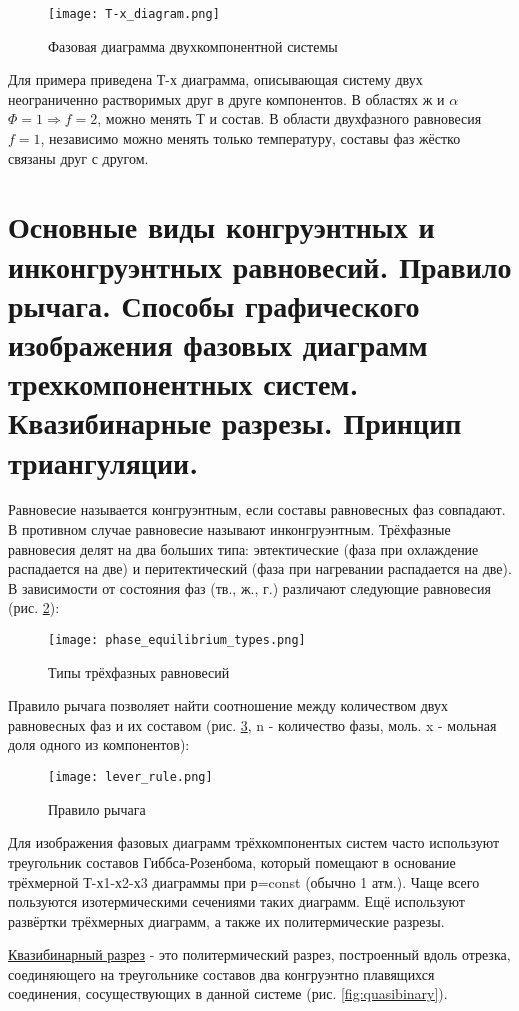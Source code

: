 \begin{figure}[h!]
\centering
\texttt{[image: T-x\_diagram.png]}\caption{Фазовая диаграмма двухкомпонентной системы}\label{fig:T-x_diagram}
\end{figure}
Для примера приведена Т-х диаграмма, описывающая систему двух неограниченно растворимых друг в друге компонентов. В областях ж и $\alpha$ $\Phi=1 \Rightarrow f=2$, можно менять Т и состав. В области двухфазного равновесия $f=1$, независимо можно менять только температуру, составы фаз жёстко связаны друг с другом.
\section{Основные виды конгруэнтных и инконгруэнтных равновесий. Правило
рычага. Способы графического изображения фазовых диаграмм
трехкомпонентных систем. Квазибинарные разрезы. Принцип триангуляции.} 
Равновесие называется конгруэнтным, если составы равновесных фаз совпадают. В противном случае равновесие называют инконгруэнтным. Трёхфазные равновесия делят на два больших типа: эвтектические (фаза при охлаждение распадается на две) и перитектический (фаза при нагревании распадается на две). В зависимости от состояния фаз (тв., ж., г.) различают следующие равновесия (рис. \ref{fig:phase_equilibrium_types}):
\begin{figure}[h!]
\centering
\texttt{[image: phase\_equilibrium\_types.png]}\caption{Типы трёхфазных равновесий}\label{fig:phase_equilibrium_types}
\end{figure}
\par Правило рычага позволяет найти соотношение между количеством двух равновесных фаз и их составом (рис. \ref{fig:lever_rule}, n - количество фазы, моль. x - мольная доля одного из компонентов):
\begin{figure}[h!]
\centering
\texttt{[image: lever\_rule.png]}\caption{Правило рычага}\label{fig:lever_rule}
\end{figure}
\par Для изображения фазовых диаграмм трёхкомпонентых систем часто используют треугольник составов Гиббса-Розенбома, который помещают в основание трёхмерной Т-х1-х2-х3 диаграммы при р=const (обычно 1 атм.). Чаще всего пользуются изотермическими сечениями таких диаграмм. Ещё используют развёртки трёхмерных диаграмм, а также их политермические разрезы. 
\par \underline{Квазибинарный разрез} - это политермический разрез, построенный вдоль отрезка, соединяющего на треугольнике составов два конгруэнтно плавящихся соединения, сосуществующих в данной системе (рис. \ref{fig:quasibinary}).
